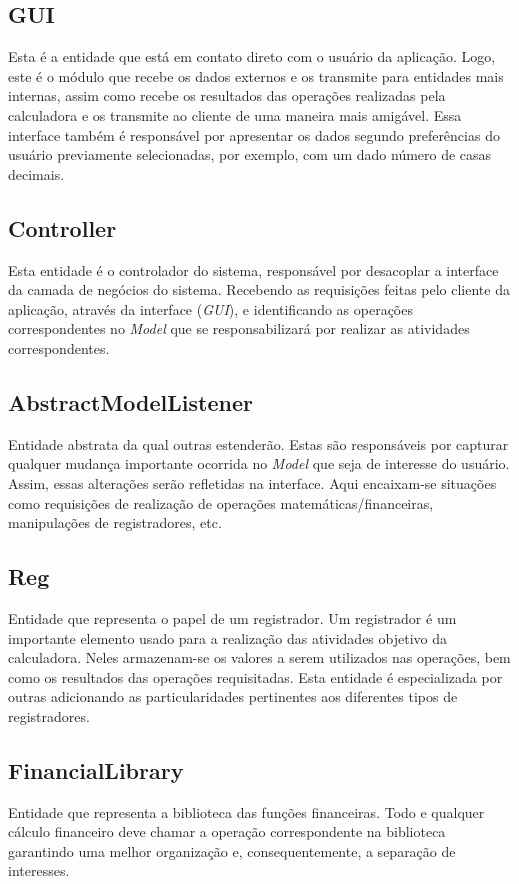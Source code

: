 \subsection{GUI}
Esta é a entidade que está em contato direto com o usuário da aplicação. Logo, este é o módulo que recebe os dados externos e os transmite para entidades mais internas, assim como recebe os resultados das operações realizadas pela calculadora e os transmite ao cliente de uma maneira mais amigável. Essa interface também é responsável por apresentar os dados segundo preferências do usuário previamente selecionadas, por exemplo, com um dado número de casas decimais.

\subsection{Controller}
Esta entidade é o controlador do sistema, responsável por desacoplar a interface da camada de negócios do sistema. Recebendo as requisições feitas pelo cliente da aplicação, através da interface (\textit{GUI}), e identificando as operações correspondentes no \textit{Model} que se responsabilizará por realizar as atividades correspondentes.

\subsection{AbstractModelListener}
Entidade abstrata da qual outras estenderão. Estas são responsáveis por capturar qualquer mudança importante ocorrida no \textit{Model} que seja de interesse do usuário. Assim, essas alterações serão refletidas na interface. Aqui encaixam-se situações como requisições de realização de operações matemáticas/financeiras, manipulações de registradores, etc.

\subsection{Reg}
Entidade que representa o papel de um registrador. Um registrador é um importante elemento usado para a realização das atividades objetivo da calculadora. Neles armazenam-se os valores a serem utilizados nas operações, bem como os resultados das operações requisitadas. Esta entidade é especializada por outras adicionando as particularidades pertinentes aos diferentes tipos de registradores.

\subsection{FinancialLibrary}
Entidade que representa a biblioteca das funções financeiras. Todo e qualquer cálculo financeiro deve chamar a operação correspondente na biblioteca garantindo uma melhor organização e, consequentemente, a separação de interesses.

